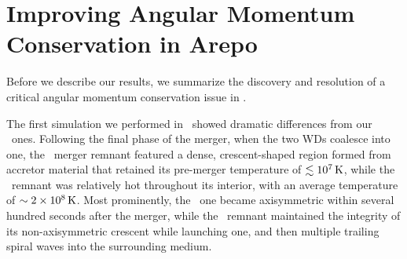 \section{Improving Angular Momentum Conservation in Arepo}
\label{sec:c3_fixingarepo}

Before we describe our results, we summarize the discovery and resolution of a critical angular momentum conservation issue in \arepo.


The first simulation we performed in \arepo\ showed dramatic differences from our \gasoline\ ones.  Following the final phase of the merger, when the two WDs coalesce into one, the \arepo\ merger remnant featured a dense, crescent-shaped region formed from accretor material that retained its pre-merger temperature of $\lesssim10^7\,\mathrm{K}$, while the \gasoline\ remnant was relatively hot throughout its interior, with an average temperature of $\sim2\times10^8\,\mathrm{K}$.  Most prominently, the \gasoline\ one became axisymmetric within several hundred seconds after the merger, while the \arepo\ remnant maintained the integrity of its non-axisymmetric crescent while launching one, and then multiple trailing spiral waves into the surrounding medium.


